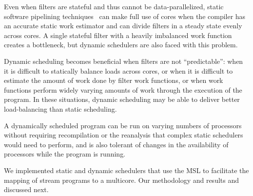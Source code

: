 Even when filters are stateful and thus cannot be data-parallelized,
static software pipelining techniques~\cite{asplos06} can make full
use of cores when the compiler has an accurate static work estimator
and can divide filters in a steady state evenly across
cores. A single stateful filter with a heavily imbalanced work
function creates a bottleneck, but dynamic schedulers are also faced
with this problem. 

Dynamic scheduling becomes beneficial when filters are not
``predictable'': when it is difficult to statically balance loads
across cores, or when it is difficult to estimate the amount of work
done by filter work functions, or when work functions perform widely
varying amounts of work through the execution of the program. In these
situations, dynamic scheduling may be able to deliver better
load-balancing than static scheduling.

A dynamically scheduled program can be run on varying numbers of
processors without requiring recompilation or the reanalysis that
complex static schedulers would need to perform, and is also tolerant
of changes in the availability of processors while the program is
running. 

We implemented static and dynamic schedulers that use the MSL to
facilitate the mapping of stream programs to a multicore. Our
methodology and results and discussed next.




